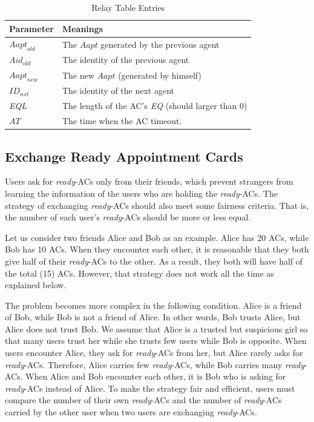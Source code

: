 \begin{table} [hbtp]
\caption{Relay Table Entries}
\label{table:RelayTableEntries}
\centering
\tabulinesep=2mm
\begin{tabu} to 110 mm {|X[1,c]|X[4,l]|} \hline 
Parameter & Meanings \\ \hline 
${Aapt}_{old}$ & The $Aapt$ generated by the previous agent \\ \hline 
${Aid}_{old}$ & The identity of the previous agent \\ \hline 
${Aapt}_{new}$ & The new $Aapt$ (generated by himself) \\ \hline 
${ID}_{nxt}$ & The identity of the next agent \\ \hline 
\textit{EQL} & The length of the AC's \textit{EQ} (should larger than 0) \\ \hline 
$AT$ & The time when the AC timeout. \\ \hline 
\end{tabu}
\end{table}

\subsection{ Exchange Ready Appointment Cards}

\noindent Users ask for \textit{ready}-ACs only from their friends, which prevent strangers from learning the information of the users who are holding the \textit{ready}-ACs. The strategy of exchanging \textit{ready}-ACs should also meet some fairness criteria. That is, the number of each user's \textit{ready}-ACs should be more or less equal. 

Let us consider two friends Alice and Bob as an example. Alice has 20 ACs, while Bob has 10 ACs. When they encounter each other, it is reasonable that they both give half of their \textit{ready}-ACs to the other. As a result, they both will have half of the total (15) ACs. However, that strategy does not work all the time as explained below.

The problem becomes more complex in the following condition. Alice is a friend of Bob, while Bob is not a friend of Alice. In other words, Bob trusts Alice, but Alice does not trust Bob. We assume that Alice is a trusted but suspicious girl so that many users trust her while she trusts few users while Bob is opposite. When users encounter Alice, they ask for \textit{ready}-ACs from her, but Alice rarely asks for \textit{ready}-ACs. Therefore, Alice carries few \textit{ready}-ACs, while Bob carries many \textit{ready}-ACs. When Alice and Bob encounter each other, it is Bob who is asking for \textit{ready}-ACs instead of Alice. To make the strategy fair and efficient, users must compare the number of their own \textit{ready}-ACs and the number of \textit{ready}-ACs carried by the other user when two users are exchanging \textit{ready}-ACs.


